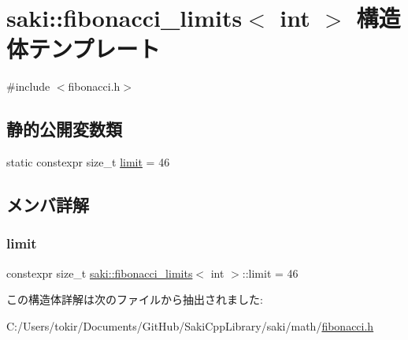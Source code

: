 \hypertarget{structsaki_1_1fibonacci__limits_3_01int_01_4}{}\section{saki\+:\+:fibonacci\+\_\+limits$<$ int $>$ 構造体テンプレート}
\label{structsaki_1_1fibonacci__limits_3_01int_01_4}


{\ttfamily \#include $<$fibonacci.\+h$>$}

\subsection*{静的公開変数類}
\begin{DoxyCompactItemize}
\item 
static constexpr size\+\_\+t \mbox{\hyperlink{structsaki_1_1fibonacci__limits_3_01int_01_4_ae58f6b545454966902baa93e8cef278d}{limit}} = 46
\end{DoxyCompactItemize}


\subsection{メンバ詳解}
\mbox{\label{structsaki_1_1fibonacci__limits_3_01int_01_4_ae58f6b545454966902baa93e8cef278d}} 
\subsubsection{\texorpdfstring{limit}{limit}}
{\footnotesize\ttfamily constexpr size\+\_\+t \mbox{\hyperlink{structsaki_1_1fibonacci__limits}{saki\+::fibonacci\+\_\+limits}}$<$ int $>$\+::limit = 46\hspace{0.3cm}{\ttfamily [static]}}



この構造体詳解は次のファイルから抽出されました\+:\begin{DoxyCompactItemize}
\item 
C\+:/\+Users/tokir/\+Documents/\+Git\+Hub/\+Saki\+Cpp\+Library/saki/math/\mbox{\hyperlink{fibonacci_8h}{fibonacci.\+h}}\end{DoxyCompactItemize}
